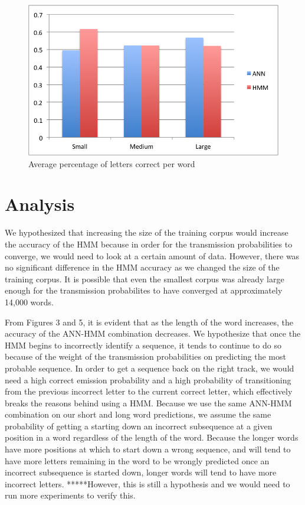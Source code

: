 \documentclass[11pt,a4paper,twocolumn]{article}
\begin{document}
\begin{figure}[h]
\centering
\caption{Average percentage of letters correct per word}
\includegraphics[scale=0.55]{img/wordCorrectness.png}
\end{figure}


\section{Analysis}

We hypothesized that increasing the size of the training corpus would increase the accuracy of the HMM because in order for the transmission probabilities to converge, we would need to look at a certain amount of data. However, there was no significant difference in the HMM accuracy as we changed the size of the training corpus. It is possible that even the smallest corpus was already large enough for the transmission probabilites to have converged at approximately 14,000 words.

From Figures 3 and 5, it is evident that as the length of the word increases, the accuracy of the ANN-HMM combination decreases. We hypothesize that once the HMM begins to incorrectly identify a sequence, it tends to continue to do so because of the weight of the transmission probabilities on predicting the most probable sequence. In order to get a sequence back on the right track, we would need a high correct emission probability and a high probability of transitioning from the previous incorrect letter to the current correct letter, which effectively breaks the reasons behind using a HMM. Because we use the same ANN-HMM combination on our short and long word predictions, we assume the same probability of getting a starting down an incorrect subsequence at a given position in a word regardless of the length of the word. Because the longer words have more positions at which to start down a wrong sequence, and will tend to have more letters remaining in the word to be wrongly predicted once an incorrect subsequence is started down, longer words will tend to have more incorrect letters. *****However, this is still a hypothesis and we would need to run more experiments to verify this.
\end{document}
